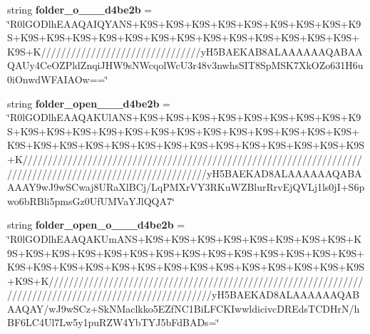 \begin{DoxyCompactItemize}
string {\bfseries folder\+\_\+o\+\_\+\_\+\_\+d4be2b} = \char`\"{}R0l\+G\+O\+Dlh\+E\+A\+A\+Q\+A\+I\+Q\+Y\+A\+NS+K9S+K9S+K9S+K9S+K9S+K9S+K9S+K9S+K9S+K9S+K9S+K9S+K9S+K9S+K9S+K9S+K9S+K9S+K9S+K9S+K9S+K9S+K9S+K////////////////////////////////y\+H5\+B\+A\+E\+K\+A\+B8\+A\+L\+A\+A\+A\+A\+A\+A\+Q\+A\+B\+A\+A\+Q\+A\+Uy4\+Ce\+O\+Z\+Pld\+Znqi\+J\+H\+W9s\+N\+Wcqol\+Wc\+U3r48v3nwhs\+S\+I\+T8\+Sp\+M\+S\+K7\+Xk\+O\+Zo631\+H6u0i\+Onwd\+W\+F\+A\+I\+A\+Ow==\char`\"{}
\item 
\mbox{\label{class_c_utils_1_1_utils_1_1_resources_1_1_icons_a13a639e8075d476a6a40b77cdfd253b7}} 
string {\bfseries folder\+\_\+open\+\_\+\_\+\_\+d4be2b} = \char`\"{}R0l\+G\+O\+Dlh\+E\+A\+A\+Q\+A\+K\+Ul\+A\+NS+K9S+K9S+K9S+K9S+K9S+K9S+K9S+K9S+K9S+K9S+K9S+K9S+K9S+K9S+K9S+K9S+K9S+K9S+K9S+K9S+K9S+K9S+K9S+K9S+K9S+K9S+K9S+K9S+K9S+K9S+K9S+K9S+K9S+K9S+K9S+K9S+K////////////////////////////////////////////////////////////////////////////////////////////////////////////y\+H5\+B\+A\+E\+K\+A\+D8\+A\+L\+A\+A\+A\+A\+A\+A\+Q\+A\+B\+A\+A\+A\+A\+Y9w\+J9w\+S\+Cwaj8\+U\+Ra\+Xl\+B\+Cj/Lq\+P\+M\+Xr\+V\+Y3\+R\+Ku\+W\+Z\+Blur\+Rrv\+Ej\+Q\+V\+Lj1ls0jI+S6pwo6b\+R\+Bli5pms\+Gz0\+Uf\+U\+M\+Va\+Y\+Jl\+Q\+Q\+A7\char`\"{}
\item 
\mbox{\label{class_c_utils_1_1_utils_1_1_resources_1_1_icons_a943d560bd69b38e2a6f17ab78e0496af}} 
string {\bfseries folder\+\_\+open\+\_\+o\+\_\+\_\+\_\+d4be2b} = \char`\"{}R0l\+G\+O\+Dlh\+E\+A\+A\+Q\+A\+K\+Um\+A\+NS+K9S+K9S+K9S+K9S+K9S+K9S+K9S+K9S+K9S+K9S+K9S+K9S+K9S+K9S+K9S+K9S+K9S+K9S+K9S+K9S+K9S+K9S+K9S+K9S+K9S+K9S+K9S+K9S+K9S+K9S+K9S+K9S+K9S+K9S+K9S+K9S+K9S+K////////////////////////////////////////////////////////////////////////////////////////////////////////y\+H5\+B\+A\+E\+K\+A\+D8\+A\+L\+A\+A\+A\+A\+A\+A\+Q\+A\+B\+A\+A\+Q\+AY/w\+J9w\+S\+Cz+Sk\+N\+Maclkko5\+E\+Zf\+N\+C1\+Bi\+L\+F\+C\+K\+Iwwldicivc\+D\+R\+Eds\+T\+C\+D\+HrN/h\+B\+F6\+L\+C4\+Ul7\+Lw5y1pu\+R\+Z\+W4\+Yb\+T\+Y\+J5b\+Fd\+B\+A\+Ds=\char`\"{}
\item 
\mbox{\label{class_c_utils_1_1_utils_1_1_resources_1_1_icons_a37411c4297633ea55fab72a54cd75cfb}} 

\end{DoxyCompactItemize}
